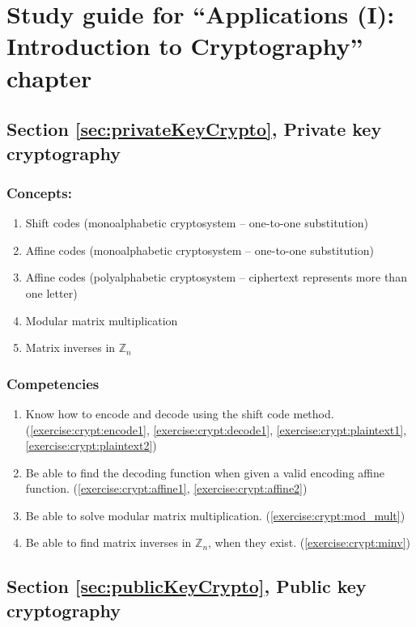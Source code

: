 \section{Study guide  for ``Applications (I): Introduction to Cryptography''  chapter}
\label{sec:Cryptography:StudyGuide} 

\subsection*{Section \ref{sec:privateKeyCrypto}, Private key cryptography}
\subsubsection*{Concepts:}
\begin{enumerate}
\item 
Shift codes (monoalphabetic cryptosystem -- one-to-one substitution)
\item
Affine codes (monoalphabetic cryptosystem -- one-to-one substitution)
\item
Affine codes (polyalphabetic cryptosystem -- ciphertext represents more than one letter)
\item
Modular matrix multiplication
\item
Matrix inverses in ${\mathbb Z}_{n}$
\end{enumerate}

\subsubsection*{Competencies}
\begin{enumerate}
\item
Know how to encode and decode using the shift code method.   (\ref{exercise:crypt:encode1}, \ref{exercise:crypt:decode1}, \ref{exercise:crypt:plaintext1}, \ref{exercise:crypt:plaintext2})
\item
Be able to find the decoding function when given a valid encoding affine function.  (\ref{exercise:crypt:affine1}, \ref{exercise:crypt:affine2})
\item
Be able to solve modular matrix multiplication.  (\ref{exercise:crypt:mod_mult})
\item
Be able to find matrix inverses in ${\mathbb Z}_{n}$, when they exist.  (\ref{exercise:crypt:minv})
\end{enumerate}


\subsection*{Section \ref{sec:publicKeyCrypto}, Public key cryptography}
